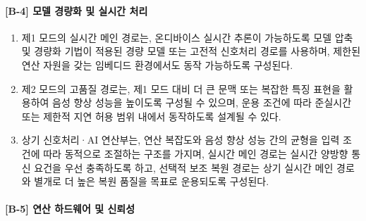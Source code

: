 \documentclass{article}
\begin{document}
\paragraph{[B-4] 모델 경량화 및 실시간 처리}

\begin{enumerate}[label = \textbf{(B.4.\arabic*)}]

    \item 제1 모드의 실시간 메인 경로는, 온디바이스 실시간 추론이 가능하도록
    모델 압축 및 경량화 기법이 적용된 경량 모델 또는 고전적 신호처리 경로를
    사용하며, 제한된 연산 자원을 갖는 임베디드 환경에서도 동작 가능하도록 구성된다.

    \item 제2 모드의 고품질 경로는, 제1 모드 대비 더 큰 문맥 또는 복잡한 특징 표현을 활용하여 음성 향상 성능을 높이도록 구성될 수 있으며, 운용 조건에 따라 준실시간 또는 제한적 지연 허용 범위 내에서 동작하도록 설계될 수 있다.

    \item 상기 신호처리·AI 연산부는, 연산 복잡도와 음성 향상 성능 간의
    균형을 입력 조건에 따라 동적으로 조절하는 구조를 가지며, 실시간 메인 경로는 실시간 양방향 통신 요건을 우선 충족하도록 하고, 선택적 보조 복원 경로는 상기 실시간 메인 경로와 별개로 더 높은 복원 품질을 목표로 운용되도록 구성된다.

\end{enumerate}


\paragraph{[B-5] 연산 하드웨어 및 신뢰성}
\end{document}
